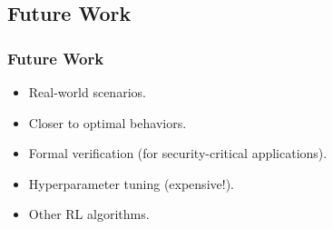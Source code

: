 \subsection{Future Work}

\begin{frame}
    \frametitle{Future Work}

    \begin{itemize}
        \item Real-world scenarios.
        \item Closer to optimal behaviors.
        \item Formal verification (for security-critical applications).
        \item Hyperparameter tuning (expensive!).
        \item Other RL algorithms.
    \end{itemize}
\end{frame}
